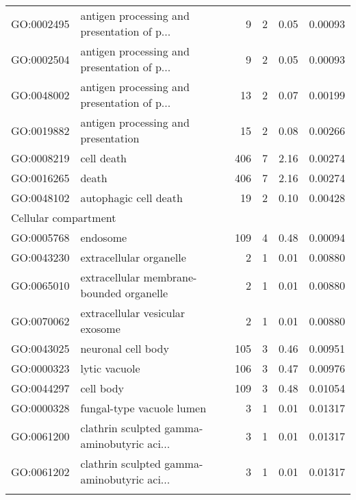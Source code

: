 \begin{longtable}{lp{5cm}rrrl}
  GO:0002495 & antigen processing and presentation of p... &   9 &   2 & 0.05 & 0.00093 \\ 
  GO:0002504 & antigen processing and presentation of p... &   9 &   2 & 0.05 & 0.00093 \\ 
  GO:0048002 & antigen processing and presentation of p... &  13 &   2 & 0.07 & 0.00199 \\ 
  GO:0019882 & antigen processing and presentation &  15 &   2 & 0.08 & 0.00266 \\ 
  GO:0008219 & cell death & 406 &   7 & 2.16 & 0.00274 \\ 
  GO:0016265 & death & 406 &   7 & 2.16 & 0.00274 \\ 
  GO:0048102 & autophagic cell death &  19 &   2 & 0.10 & 0.00428 \\ 
  \hline
  \multicolumn{6}{l}{Cellular compartment}  \\ 
  GO:0005768 & endosome & 109 &   4 & 0.48 & 0.00094 \\ 
  GO:0043230 & extracellular organelle &   2 &   1 & 0.01 & 0.00880 \\ 
  GO:0065010 & extracellular membrane-bounded organelle &   2 &   1 & 0.01 & 0.00880 \\ 
  GO:0070062 & extracellular vesicular exosome &   2 &   1 & 0.01 & 0.00880 \\ 
  GO:0043025 & neuronal cell body & 105 &   3 & 0.46 & 0.00951 \\ 
  GO:0000323 & lytic vacuole & 106 &   3 & 0.47 & 0.00976 \\ 
  GO:0044297 & cell body & 109 &   3 & 0.48 & 0.01054 \\ 
  GO:0000328 & fungal-type vacuole lumen &   3 &   1 & 0.01 & 0.01317 \\ 
  GO:0061200 & clathrin sculpted gamma-aminobutyric aci... &   3 &   1 & 0.01 & 0.01317 \\ 
  GO:0061202 & clathrin sculpted gamma-aminobutyric aci... &   3 &   1 & 0.01 & 0.01317 \\ 
  \hline\\
\end{longtable}

